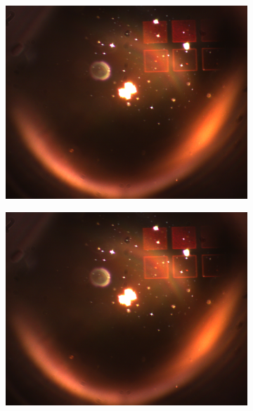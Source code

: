 \begin{figure}[ht]
    \begin{subfigure}{0.3\linewidth}
      \includegraphics[width=\linewidth]{data/Gruppe2/image_6.png}
      \caption{}
      \label{fig:subfig7}
    \end{subfigure}
    \begin{subfigure}{0.3\linewidth}
      \includegraphics[width=\linewidth]{data/Gruppe2/image_7.png}
      \caption{}
      \label{fig:subfig8}
    \end{subfigure}
    \begin{subfigure}{0.3\linewidth}

\end{subfigure}
\end{figure}
